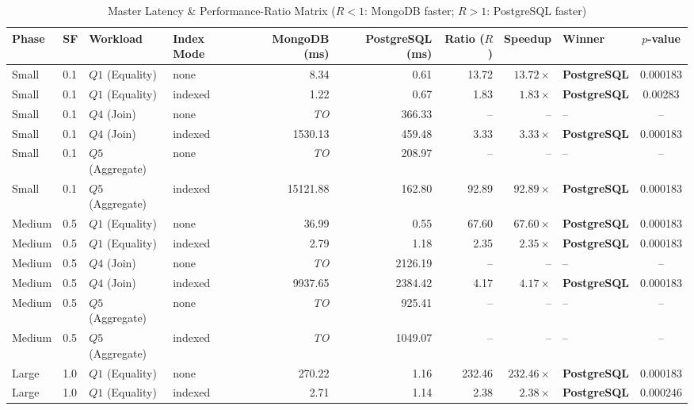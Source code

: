 \documentclass[10pt,a4paper,twocolumn]{article}
\begin{document}
\begin{table}[t]
\caption{Master Latency \& Performance-Ratio Matrix
  ($R < 1$: MongoDB faster;\; $R > 1$: PostgreSQL faster)}
\label{tab:master}
\centering\small
\renewcommand{\arraystretch}{1.2}
\begin{adjustbox}{max width=\textwidth}
\begin{tabular}{@{}llllrrrrlc@{}}
\toprule
\textbf{Phase} & \textbf{SF} & \textbf{Workload} & \textbf{Index Mode}
  & \textbf{MongoDB (ms)} & \textbf{PostgreSQL (ms)}
  & \textbf{Ratio ($R$)} & \textbf{Speedup}
  & \textbf{Winner} & \textbf{$p$-value} \\ \midrule
Small & 0.1 & $Q1$ (Equality) & none & 8.34 & 0.61 & 13.72 & $13.72\times$ & \textbf{PostgreSQL} & 0.000183 \\
Small & 0.1 & $Q1$ (Equality) & indexed & 1.22 & 0.67 & 1.83 & $1.83\times$ & \textbf{PostgreSQL} & 0.00283 \\
Small & 0.1 & $Q4$ (Join) & none & \textit{TO} & 366.33 & -- & -- & -- & -- \\
Small & 0.1 & $Q4$ (Join) & indexed & 1530.13 & 459.48 & 3.33 & $3.33\times$ & \textbf{PostgreSQL} & 0.000183 \\
Small & 0.1 & $Q5$ (Aggregate) & none & \textit{TO} & 208.97 & -- & -- & -- & -- \\
Small & 0.1 & $Q5$ (Aggregate) & indexed & 15121.88 & 162.80 & 92.89 & $92.89\times$ & \textbf{PostgreSQL} & 0.000183 \\
Medium & 0.5 & $Q1$ (Equality) & none & 36.99 & 0.55 & 67.60 & $67.60\times$ & \textbf{PostgreSQL} & 0.000183 \\
Medium & 0.5 & $Q1$ (Equality) & indexed & 2.79 & 1.18 & 2.35 & $2.35\times$ & \textbf{PostgreSQL} & 0.000183 \\
Medium & 0.5 & $Q4$ (Join) & none & \textit{TO} & 2126.19 & -- & -- & -- & -- \\
Medium & 0.5 & $Q4$ (Join) & indexed & 9937.65 & 2384.42 & 4.17 & $4.17\times$ & \textbf{PostgreSQL} & 0.000183 \\
Medium & 0.5 & $Q5$ (Aggregate) & none & \textit{TO} & 925.41 & -- & -- & -- & -- \\
Medium & 0.5 & $Q5$ (Aggregate) & indexed & \textit{TO} & 1049.07 & -- & -- & -- & -- \\
Large & 1.0 & $Q1$ (Equality) & none & 270.22 & 1.16 & 232.46 & $232.46\times$ & \textbf{PostgreSQL} & 0.000183 \\
Large & 1.0 & $Q1$ (Equality) & indexed & 2.71 & 1.14 & 2.38 & $2.38\times$ & \textbf{PostgreSQL} & 0.000246 \\

\end{tabular}
\end{adjustbox}
\end{table}
\end{document}
